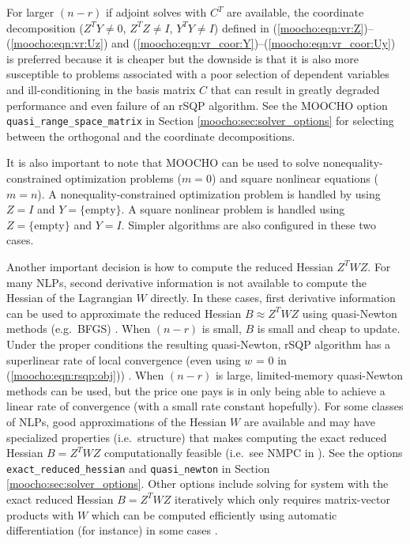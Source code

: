 \documentclass[pdf,ps2pdf,11pt]{SANDreport}
\begin{document}
{{For larger $(n-r)$ if adjoint solves with $C^T$ are available, the coordinate
decomposition ($Z^T Y {}\neq 0$, $Z^T Z {}\neq I$, $Y^T Y \neq I$) defined in
(\ref{moocho:eqn:vr:Z})--(\ref{moocho:eqn:vr:Uz}) and
(\ref{moocho:eqn:vr_coor:Y})--(\ref{moocho:eqn:vr_coor:Uy}) is preferred
because it is cheaper but the downside is that it is also more susceptible to
problems associated with a poor selection of dependent variables and
ill-conditioning in the basis matrix $C$ that can result in greatly degraded
performance and even failure of an rSQP algorithm.  See the MOOCHO option
\texttt{quasi\-\_range\-\_space\-\_matrix} in Section
{}\ref{moocho:sec:solver_options} for selecting between the orthogonal and the
coordinate decompositions.

It is also important to note that MOOCHO can be used to solve
nonequality-constrained optimization problems ($m=0$) and square nonlinear
equations ($m=n$).  A nonequality-constrained optimization problem is handled
by using $Z=I$ and $Y=\{\mbox{empty}\}$.  A square nonlinear problem is
handled using $Z=\{\mbox{empty}\}$ and $Y=I$.  Simpler algorithms are also
configured in these two cases.

Another important decision is how to compute the reduced Hessian $Z^T W Z$.
For many NLPs, second derivative information is not available to compute the
Hessian of the Lagrangian $W$ directly.  In these cases, first derivative
information can be used to approximate the reduced Hessian $B {}\approx Z^T W
Z$ using quasi-Newton methods (e.g.\ BFGS) {}\cite{ref:nocedal_overton_1985}.
When $(n-r)$ is small, $B$ is small and cheap to update.  Under the proper
conditions the resulting quasi-Newton, rSQP algorithm has a superlinear rate
of local convergence (even using $w$ = 0 in (\ref{moocho:eqn:rsqp:obj}))
{}\cite{ref:biegler_et_al_1995}.  When $(n-r)$ is large, limited-memory
quasi-Newton methods can be used, but the price one pays is in only being able
to achieve a linear rate of convergence (with a small rate constant
hopefully).  For some classes of NLPs, good approximations of the Hessian $W$
are available and may have specialized properties (i.e.\ structure) that makes
computing the exact reduced Hessian $B = Z^T W Z$ computationally feasible
(i.e.\ see NMPC in {}\cite{RABartlett_2001}).  See the options
\texttt{exact\_reduced\_hessian} and \texttt{quasi\_newton} in Section
{}\ref{moocho:sec:solver_options}.  Other options include solving for
system with the exact reduced Hessian $B = Z^T W Z$ iteratively which
only requires matrix-vector products with $W$ which can be computed
efficiently using automatic differentiation (for instance) in some
cases {}\cite{ref:adolc_1996}.

}}
\end{document}
